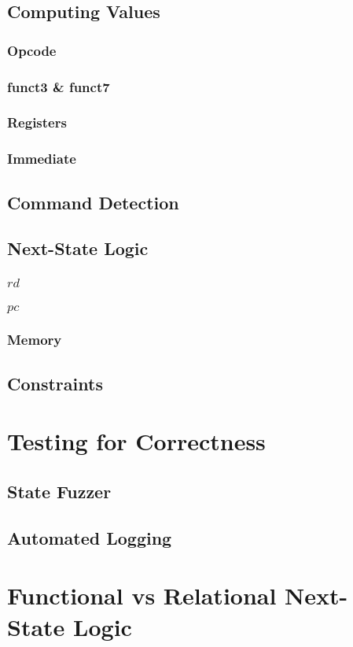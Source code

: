 \subsection{Computing Values}
\subsubsection{Opcode}
\subsubsection{funct3 \& funct7}
\subsubsection{Registers}
\subsubsection{Immediate}
\subsection{Command Detection}
\subsection{Next-State Logic}
\subsubsection{$rd$}
\subsubsection{$pc$}
\subsubsection{Memory}
\subsection{Constraints}
\section{Testing for Correctness}
\subsection{State Fuzzer}
\subsection{Automated Logging}

\section{Functional vs Relational Next-State Logic}\label{sec:funcVSrel}